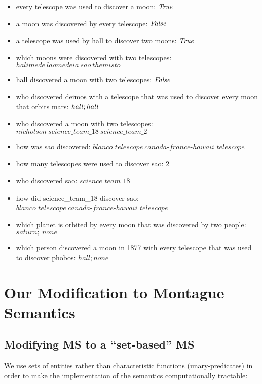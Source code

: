 \documentclass[../main.tex]{subfiles}
\begin{document}
\begin{refsection}
\begin{itemize}
	\setlength\itemsep{0em}
	\item every telescope was used to discover a moon: $\mathit{True}$
	\item a moon was discovered by every telescope: $\mathit{False}$
	\item a telescope was used by hall to discover two moons: $\mathit{True}$
	\item which moons were discovered with two telescopes: \\$\mathit{halimede\ laomedeia\ sao\ themisto}$
	\item hall discovered a moon with two telescopes: $\mathit{False}$
	\item who discovered deimos with a telescope that was used to discover every moon that orbits mars: $\mathit{hall};hall$
	\item who discovered a moon with two telescopes: \\ $\mathit{nicholson\ science\_team\_18\ science\_team\_2}$
	\item how was sao discovered: $\mathit{blanco\_telescope\ canada}$-$\mathit{france}$-$\mathit{hawaii\_telescope}$
	\item how many telescopes were used to discover sao: $2$
	\item who discovered sao: $\mathit{science\_team\_18}$
	\item how did science\_team\_18 discover sao: \\ $\mathit{blanco\_telescope\ canada}$-$\mathit{france}$-$\mathit{hawaii\_telescope}$
	\item which planet is orbited by every moon that was discovered by two people: $\mathit{saturn;\ none}$
	\item which person discovered a moon in 1877 with every telescope that was used to discover phobos: $\mathit{hall; none}$
\end{itemize}

\section{Our Modification to Montague Semantics}
\label{ext:modification}
\subsection{Modifying MS to a ``set-based'' MS}

We use sets of entities rather than characteristic functions (unary-predicates) in order to make the
implementation of the semantics computationally tractable:


\end{refsection}
\end{document}
